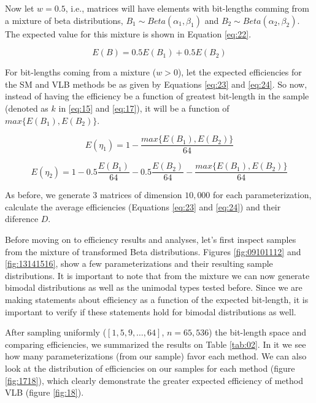 \documentclass[10pt]{article}
\begin{document}
Now let $w = 0.5$, i.e., matrices will have elements with bit-lengths comming from a mixture of beta distributions, $B_1\sim Beta(\alpha_1,\beta_1)$ and $B_2\sim Beta(\alpha_2,\beta_2)$. The expected value for this mixture is shown in Equation \ref{eq:22}.
 
\begin{equation}\label{eq:22}
 E(B) = 0.5 E(B_1) + 0.5 E(B_2)
\end{equation}
 
For bit-lengths coming from a mixture ($w>0$), let the expected efficiencies for the SM and VLB methods be as given by Equations \ref{eq:23} and \ref{eq:24}. So now, instead of having the efficiency be a function of greatest bit-length in the sample (denoted as  $k$ in \ref{eq:15} and \ref{eq:17}), it will be a function of $max\{E(B_1),E(B_2)\}$.

\begin{equation}\label{eq:23}
 E(\eta_1) = 1 - \frac{max\{E(B_1),E(B_2)\}}{64}
\end{equation}

\begin{equation}\label{eq:24}
 E(\eta_2) = 1 - 0.5\frac{E(B_1)}{64} - 0.5\frac{E(B_2)}{64} - \frac{max\{E(B_1),E(B_2)\}}{64}
\end{equation}
 
As before, we generate 3 matrices of dimension $10,000$ for each parameterization, calculate the average efficiencies (Equations \ref{eq:23} and \ref{eq:24}) and their diference $D$.

Before moving on to efficiency results and analyses, let's first inspect samples from the mixture of transformed Beta distributions. Figures \ref{fig:09101112} and \ref{fig:13141516}, show a few parameterizations and their resulting sample distributions. It is important to note that from the mixture we can now generate bimodal distributions as well as the unimodal types tested before. Since we are making statements about efficiency as a function of the expected bit-length, it is important to verify if these statements hold for bimodal  distributions as well.

After sampling uniformly ($[1,5,9,\ldots,64]$, $n=65,536$) the bit-length space and comparing efficiencies, we summarized the results on Table \ref{tab:02}. In it we see how many parameterizations (from our sample) favor each method. We can also look at the distribution of efficiencies on our samples for each method (figure \ref{fig:1718}), which clearly demonstrate the greater expected efficiency of method VLB (figure \ref{fig:18}).
\end{document}

